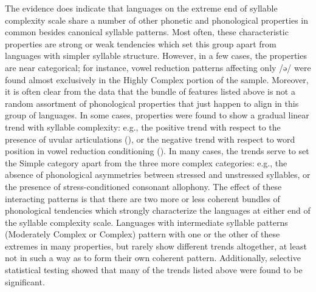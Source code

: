   The evidence does indicate that languages on the extreme end of syllable complexity scale share a number of other phonetic and phonological properties in common besides canonical syllable patterns. Most often, these characteristic properties are strong or weak tendencies which set this group apart from languages with simpler syllable structure. However, in a few cases, the properties are near categorical; for instance, vowel reduction patterns affecting only /ə/ were found almost exclusively in the Highly Complex portion of the sample. Moreover, it is often clear from the data that the bundle of features listed above is not a random assortment of phonological properties that just happen to align in this group of languages. In some cases, properties were found to show a gradual linear trend with syllable complexity: e.g., the positive trend with respect to the presence of uvular articulations (), or the negative trend with respect to word position in vowel reduction conditioning (). In many cases, the trends serve to set the Simple category apart from the three more complex categories: e.g., the absence of phonological asymmetries between stressed and unstressed syllables, or the presence of stress-conditioned consonant allophony. The effect of these interacting patterns is that there are two more or less coherent bundles of phonological tendencies which strongly characterize the languages at either end of the syllable complexity scale. Languages with intermediate syllable patterns (Moderately Complex or Complex) pattern with one or the other of these extremes in many properties, but rarely show different trends altogether, at least not in such a way as to form their own coherent pattern. Additionally, selective statistical testing showed that many of the trends listed above were found to be significant.

